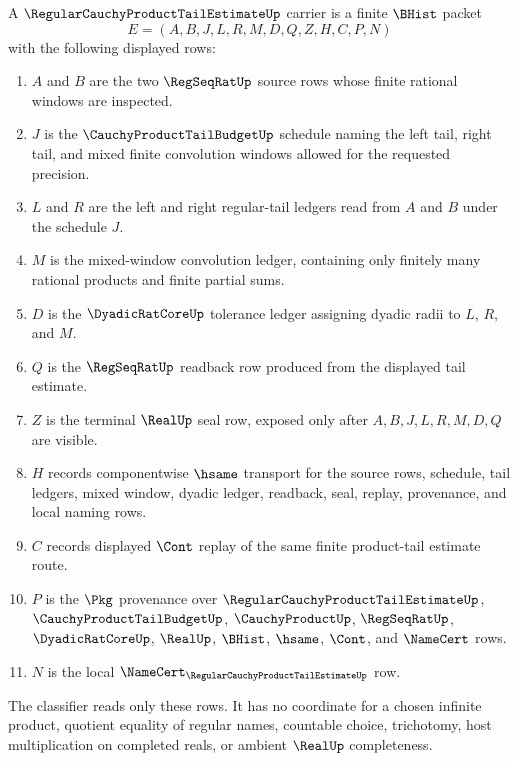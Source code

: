 \begin{definition}
\label{def:regular-cauchy-product-tail-estimate-carrier}
A $\RegularCauchyProductTailEstimateUp$ carrier is a finite $\BHist$ packet
$$
E=(A,B,J,L,R,M,D,Q,Z,H,C,P,N)
$$
with the following displayed rows:
\begin{enumerate}
\item $A$ and $B$ are the two $\RegSeqRatUp$ source rows whose finite rational windows are inspected.
\item $J$ is the $\CauchyProductTailBudgetUp$ schedule naming the left tail, right tail, and mixed finite convolution windows allowed for the requested precision.
\item $L$ and $R$ are the left and right regular-tail ledgers read from $A$ and $B$ under the schedule $J$.
\item $M$ is the mixed-window convolution ledger, containing only finitely many rational products and finite partial sums.
\item $D$ is the $\DyadicRatCoreUp$ tolerance ledger assigning dyadic radii to $L$, $R$, and $M$.
\item $Q$ is the $\RegSeqRatUp$ readback row produced from the displayed tail estimate.
\item $Z$ is the terminal $\RealUp$ seal row, exposed only after $A,B,J,L,R,M,D,Q$ are visible.
\item $H$ records componentwise $\hsame$ transport for the source rows, schedule, tail ledgers, mixed window, dyadic ledger, readback, seal, replay, provenance, and local naming rows.
\item $C$ records displayed $\Cont$ replay of the same finite product-tail estimate route.
\item $P$ is the $\Pkg$ provenance over $\RegularCauchyProductTailEstimateUp$, $\CauchyProductTailBudgetUp$, $\CauchyProductUp$, $\RegSeqRatUp$, $\DyadicRatCoreUp$, $\RealUp$, $\BHist$, $\hsame$, $\Cont$, and $\NameCert$ rows.
\item $N$ is the local $\NameCert_{\RegularCauchyProductTailEstimateUp}$ row.
\end{enumerate}
The classifier reads only these rows. It has no coordinate for a chosen infinite product, quotient equality of regular names, countable choice, trichotomy, host multiplication on completed reals, or ambient $\RealUp$ completeness.
\end{definition}

